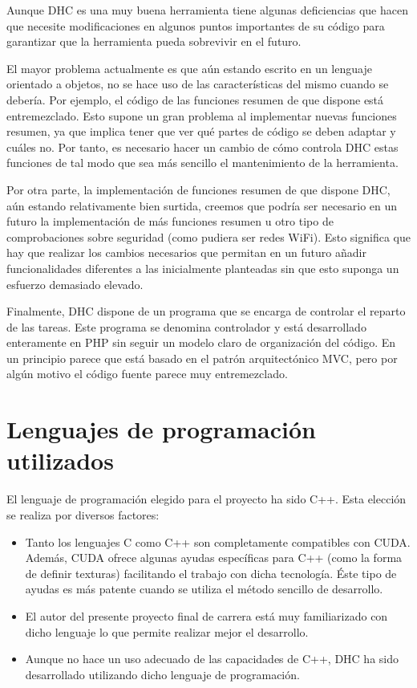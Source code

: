 Aunque DHC es una muy buena herramienta tiene algunas deficiencias que hacen que necesite modificaciones en algunos puntos importantes de su código para garantizar que la herramienta pueda sobrevivir en el futuro.

El mayor problema actualmente es que aún estando escrito en un lenguaje orientado a objetos, no se hace uso de las características del mismo cuando se debería. Por ejemplo, el código de las funciones resumen de que dispone está entremezclado. Esto supone un gran problema al implementar nuevas funciones resumen, ya que implica tener que ver qué partes de código se deben adaptar y cuáles no. Por tanto, es necesario hacer un cambio de cómo controla DHC estas funciones de tal modo que sea más sencillo el mantenimiento de la herramienta.

Por otra parte, la implementación de funciones resumen de que dispone DHC, aún estando relativamente bien surtida, creemos que podría ser necesario en un futuro la implementación de más funciones resumen u otro tipo de comprobaciones sobre seguridad (como pudiera ser redes WiFi). Esto significa que hay que realizar los cambios necesarios que permitan en un futuro añadir funcionalidades diferentes a las inicialmente planteadas sin que esto suponga un esfuerzo demasiado elevado.

Finalmente, DHC dispone de un programa que se encarga de controlar el reparto de las tareas. Este programa se denomina controlador y está desarrollado enteramente en PHP sin seguir un modelo claro de organización del código. En un principio parece que está basado en el patrón arquitectónico MVC, pero por algún motivo el código fuente parece muy entremezclado.

\section{Lenguajes de programación utilizados}

El lenguaje de programación elegido para el proyecto ha sido C++. Esta elección se realiza por diversos factores:

\begin{itemize}
	\item Tanto los lenguajes C como C++ son completamente compatibles con CUDA. Además, CUDA ofrece algunas ayudas específicas para C++ (como la forma de definir texturas) facilitando el trabajo con dicha tecnología. Éste tipo de ayudas es más patente cuando se utiliza el método sencillo de desarrollo.
	
	\item El autor del presente proyecto final de carrera está muy familiarizado con dicho lenguaje lo que permite realizar mejor el desarrollo.
	
	\item Aunque no hace un uso adecuado de las capacidades de C++, DHC ha sido desarrollado utilizando dicho lenguaje de programación.
\end{itemize}

